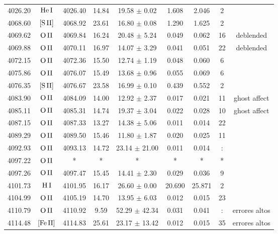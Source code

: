 \documentclass{article}
\begin{document}
\begin{table*}
\begin{adjustbox}{width=\textwidth}
\begin{tabular}{ccccccccc}
4026.20 & $\mbox{He}\thinspace \mbox{I}$ & 4026.40 & 14.84 & 19.58 $\pm$ 0.02 & 1.608 & 2.046 & 2 &  \\
4068.60 & $\mbox{[S}\thinspace \mbox{II]}$ & 4068.92 & 23.61 & 16.80 $\pm$ 0.08 & 1.290 & 1.625 & 2 &  \\
4069.62 & $\mbox{O}\thinspace \mbox{II}$ & 4069.84 & 16.24 & 20.48 $\pm$ 5.24 & 0.049 & 0.062 & 16 &  deblended \\
4069.88 & $\mbox{O}\thinspace \mbox{II}$ & 4070.11 & 16.97 & 14.07 $\pm$ 3.29 & 0.041 & 0.051 & 22 &  deblended \\
4072.15 & $\mbox{O}\thinspace \mbox{II}$ & 4072.36 & 15.50 & 12.74 $\pm$ 1.19 & 0.048 & 0.060 & 6 &  \\
4075.86 & $\mbox{O}\thinspace \mbox{II}$ & 4076.07 & 15.49 & 13.68 $\pm$ 0.96 & 0.055 & 0.069 & 6 &  \\
4076.35 & $\mbox{[S}\thinspace \mbox{II]}$ & 4076.67 & 23.58 & 16.99 $\pm$ 0.10 & 0.439 & 0.552 & 2 &  \\
4083.90 & $\mbox{O}\thinspace \mbox{II}$ & 4084.09 & 14.00 & 12.92 $\pm$ 2.37 & 0.017 & 0.021 & 11 &  ghost affect \\
4085.11 & $\mbox{O}\thinspace \mbox{II}$ & 4085.31 & 14.74 & 19.37 $\pm$ 3.04 & 0.022 & 0.028 & 10 &  ghost affect \\
4087.15 & $\mbox{O}\thinspace \mbox{II}$ & 4087.33 & 13.27 & 14.38 $\pm$ 5.06 & 0.011 & 0.014 & 22 &  \\
4089.29 & $\mbox{O}\thinspace \mbox{II}$ & 4089.50 & 15.46 & 11.80 $\pm$ 1.87 & 0.020 & 0.025 & 11 &  \\
4092.93 & $\mbox{O}\thinspace \mbox{II}$ & 4093.13 & 14.72 & 23.14 $\pm$ 21.00 & 0.011 & 0.014 & : &  \\
4097.22 & $\mbox{O}\thinspace \mbox{II}$ & * & * & * & * & * & * &  \\
4097.26 & $\mbox{O}\thinspace \mbox{II}$ & 4097.47 & 15.45 & 14.41 $\pm$ 2.30 & 0.029 & 0.036 & 9 &  \\
4101.73 & $\mbox{H}\thinspace \mbox{I}$ & 4101.95 & 16.17 & 26.60 $\pm$ 0.00 & 20.690 & 25.871 & 2 &  \\
4104.99 & $\mbox{O}\thinspace \mbox{II}$ & 4105.19 & 14.70 & 13.95 $\pm$ 6.03 & 0.012 & 0.015 & 23 &  \\
4110.79 & $\mbox{O}\thinspace \mbox{II}$ & 4110.92 & 9.59 & 52.29 $\pm$ 42.34 & 0.031 & 0.041 & : &  errores altos \\
4114.48 & $\mbox{[Fe}\thinspace \mbox{II]}$ & 4114.83 & 25.61 & 23.17 $\pm$ 13.42 & 0.012 & 0.015 & 35 &  errores altos \\

\end{tabular}
\end{adjustbox}
\end{table*}
\end{document}
